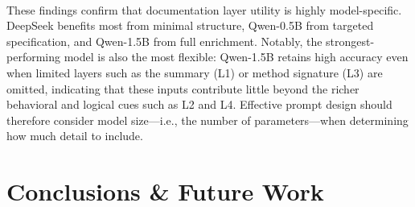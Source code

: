 \documentclass[a4paper]{usiinfbachelorproject}
\begin{document}
\\
These findings confirm that documentation layer utility is highly model-specific. DeepSeek benefits most from minimal structure, Qwen-0.5B from targeted specification, and Qwen-1.5B from full enrichment. Notably, the strongest-performing model is also the most flexible: Qwen-1.5B retains high accuracy even when limited layers such as the summary (L1) or method signature (L3) are omitted, indicating that these inputs contribute little beyond the richer behavioral and logical cues such as L2 and L4. Effective prompt design should therefore consider model size—i.e., the number of parameters—when determining how much detail to include.

\section{Conclusions \& Future Work} \label{sec:concl}
\end{document}
